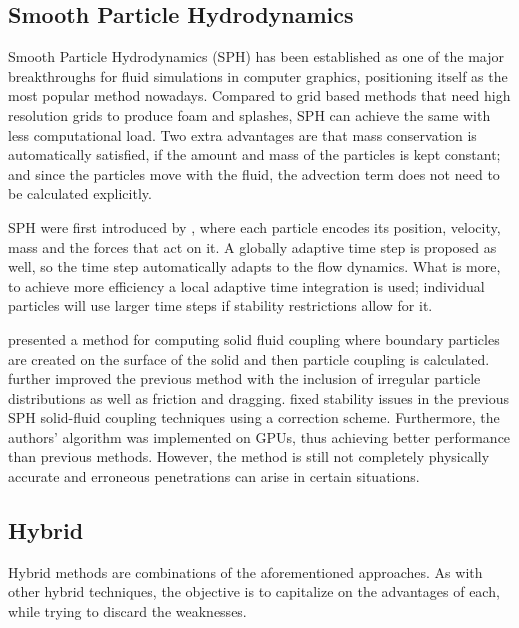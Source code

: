 \subsection{Smooth Particle Hydrodynamics}

Smooth Particle Hydrodynamics (SPH) has been established as one of the major breakthroughs for fluid simulations in computer graphics, positioning itself as the most popular method nowadays.
Compared to grid based methods that need high resolution grids to produce foam and splashes, SPH can achieve the same with less computational load.
Two extra advantages are that mass conservation is automatically satisfied, if the amount and mass of the particles is kept constant;
and since the particles move with the fluid, the advection term does not need to be calculated explicitly.

SPH were first introduced by \cite{DesbrunMathieuandGascuel1996}, where each particle encodes its position, velocity, mass and the forces that act on it.
A globally adaptive time step is proposed as well, so the time step automatically adapts to the flow dynamics.
What is more, to achieve more efficiency a local adaptive time integration is used; individual particles will use larger time steps if stability restrictions allow for it.

\cite{Muller2004} presented a method for computing solid fluid coupling where boundary particles are created on the surface of the solid and then particle coupling is calculated.
\cite{Akinci2012} further improved the previous method with the inclusion of irregular particle distributions as well as friction and dragging. 
\cite{Shao2014} fixed stability issues in the previous SPH solid-fluid coupling techniques using a correction scheme.
Furthermore, the authors' algorithm was implemented on GPUs, thus achieving better performance than previous methods.  
However, the method is still not completely physically accurate and erroneous penetrations can arise in certain situations. 

\subsection{Hybrid}

Hybrid methods are combinations of the aforementioned approaches.
As with other hybrid techniques, the objective is to capitalize on the advantages of each, while trying to discard the weaknesses.

